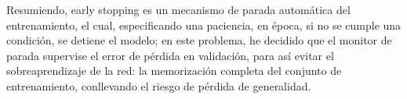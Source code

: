Resumiendo, early stopping es un mecanismo de parada automática del entrenamiento, el cual, especificando una paciencia, en época, si no se cumple una condición, se detiene el modelo; en este problema, he decidido que el monitor de parada supervise el error de pérdida en validación, para así evitar el sobreaprendizaje de la red: la memorización completa del conjunto de entrenamiento, conllevando el riesgo de pérdida de generalidad.
